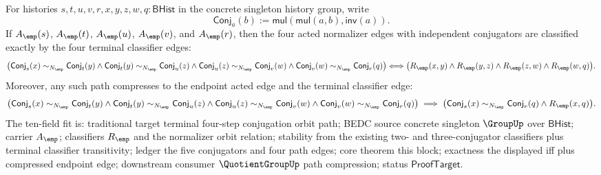 \begin{theorem}
\label{thm:group-singleton-four-conjugator-orbit-path-compression}
For histories $s,t,u,v,r,x,y,z,w,q:\mathsf{BHist}$ in the concrete singleton
history group, write
$$
\mathsf{Conj}_a(b):=\mathsf{mul}(\mathsf{mul}(a,b),\mathsf{inv}(a)).
$$
If $A_{\emp}(s)$, $A_{\emp}(t)$, $A_{\emp}(u)$, $A_{\emp}(v)$, and
$A_{\emp}(r)$, then the four acted normalizer edges with independent
conjugators are classified exactly by the four terminal classifier edges:
$$
\bigl(
\mathsf{Conj}_s(x)\sim_{N_{\emp}}\mathsf{Conj}_t(y)
\land
\mathsf{Conj}_t(y)\sim_{N_{\emp}}\mathsf{Conj}_u(z)
\land
\mathsf{Conj}_u(z)\sim_{N_{\emp}}\mathsf{Conj}_v(w)
\land
\mathsf{Conj}_v(w)\sim_{N_{\emp}}\mathsf{Conj}_r(q)
\bigr)
\Longleftrightarrow
\bigl(
R_{\emp}(x,y)\land R_{\emp}(y,z)\land R_{\emp}(z,w)\land R_{\emp}(w,q)
\bigr).
$$
Moreover, any such path compresses to the endpoint acted edge and the terminal
classifier edge:
$$
\bigl(
\mathsf{Conj}_s(x)\sim_{N_{\emp}}\mathsf{Conj}_t(y)
\land
\mathsf{Conj}_t(y)\sim_{N_{\emp}}\mathsf{Conj}_u(z)
\land
\mathsf{Conj}_u(z)\sim_{N_{\emp}}\mathsf{Conj}_v(w)
\land
\mathsf{Conj}_v(w)\sim_{N_{\emp}}\mathsf{Conj}_r(q)
\bigr)
\implies
\bigl(\mathsf{Conj}_s(x)\sim_{N_{\emp}}\mathsf{Conj}_r(q)
\land R_{\emp}(x,q)\bigr).
$$
The ten-field fit is: traditional target terminal four-step conjugation orbit
path; BEDC source concrete singleton $\GroupUp$ over $\mathsf{BHist}$; carrier
$A_{\emp}$; classifiers $R_{\emp}$ and the normalizer orbit relation; stability
from the existing two- and three-conjugator classifiers plus terminal
classifier transitivity; ledger the five conjugators and four path edges; core
theorem this block; exactness the displayed iff plus compressed endpoint edge;
downstream consumer $\QuotientGroupUp$ path compression; status
$\mathsf{ProofTarget}$.
\end{theorem}
